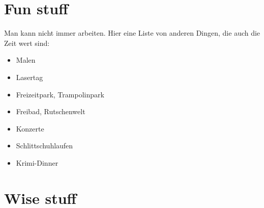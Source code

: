 \section{Fun stuff}

Man kann nicht immer arbeiten. Hier eine Liste von anderen Dingen, die auch die Zeit wert sind:

\begin{itemize}
    \item Malen
    \item Lasertag
    \item Freizeitpark, Trampolinpark
    \item Freibad, Rutschenwelt
    \item Konzerte
    \item Schlittschuhlaufen
    \item Krimi-Dinner
\end{itemize}

\section{Wise stuff}

